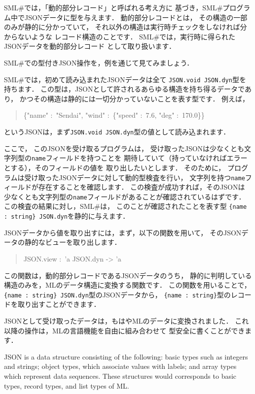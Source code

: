 \documentclass{jbook}
\newcommand{\smlsharp}{SML\#}
\newenvironment{program}{\begin{quote}\begin{tt}}%
                        {\end{tt}\end{quote}}
\begin{document}
	\smlsharp{}では，「動的部分レコード」と呼ばれる考え方に
基づき，\smlsharp{}プログラム中でJSONデータに型を与えます．
	動的部分レコードとは，
その構造の一部のみが静的に分かっていて，
それ以外の構造は実行時チェックをしなければ分からないような
レコード構造のことです．
	\smlsharp{}では，実行時に得られたJSONデータを動的部分レコード
として取り扱います．

	\smlsharp{}での型付きJSON操作を，例を通じて見てみましょう．

	\smlsharp{}では，初めて読み込まれたJSONデータは全て
{\tt JSON.void JSON.dyn}型を持ちます．
	この型は，JSONとして許されるあらゆる構造を持ち得るデータであり，
かつその構造は静的には一切分かっていないことを表す型です．
	例えば，
\begin{program}
\{"name" :\ "Sendai",
  "wind" :\ \{"speed" :\ 7.6, "deg" :\ 170.0\}\}
\end{program}
というJSONは，まず{\tt JSON.void JSON.dyn}型の値として読み込まれます．

	ここで，
このJSONを受け取るプログラムは，
受け取ったJSONは少なくとも文字列型の{\tt name}フィールドを持つことを
期待していて（持っていなければエラーとする），そのフィールドの値を
取り出したいとします．
	そのために，
プログラムは受け取ったJSONデータに対して動的型検査を行い，
文字列を持つ{\tt name}フィールドが存在することを確認します．
	この検査が成功すれば，そのJSONは
少なくとも文字列型の{\tt name}フィールドがあることが確認されているはずです．
 	この検査の結果に対し，\smlsharp{}は，
このことが確認されたことを表す型
{\tt \{name :\ string\} JSON.dyn}を静的に与えます．

	JSONデータから値を取り出すには，まず，以下の関数を用いて，
そのJSONデータの静的なビューを取り出します．
\begin{program}
JSON.view :\ 'a JSON.dyn -> 'a
\end{program}
	この関数は，動的部分レコードであるJSONデータのうち，
静的に判明している構造のみを，MLのデータ構造に変換する関数です．
	この関数を用いることで，
{\tt \{name :\ string\} JSON.dyn}型のJSONデータから，
{\tt \{name :\ string\}}型のレコードを取り出すことができます．

	JSONとして受け取ったデータは，もはやMLのデータに変換されました．
	これ以降の操作は，MLの言語機能を自由に組み合わせて
型安全に書くことができます．

\else%

	JSON is a data structure consisting of the following:
basic types such as integers and strings;
object types, which associate values with labels;
and array types which represent data sequences.
	These structures would corresponds to
basic types, record types, and list types of ML.
\end{document}

